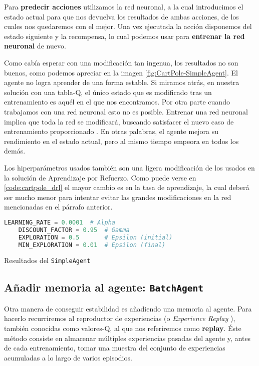 Para \textbf{predecir acciones} utilizamos la red neuronal, a la cual introducimos el estado actual para que nos devuelva los resultados de ambas acciones, de los cuales nos quedaremos con el mejor. Una vez ejecutada la acción disponemos del estado siguiente y la recompensa, lo cual podemos usar para \textbf{entrenar la red neuronal} de nuevo.

Como cabía esperar con una modificación tan ingenua, los resultados no son buenos, como podemos apreciar en la imagen \ref{fig:CartPole-SimpleAgent}. El agente no logra aprender de una forma estable. Si miramos atrás, en nuestra solución con una tabla-Q, el único estado que es modificado tras un entrenamiento es aquél en el que nos encontramos. Por otra parte cuando trabajamos con una red neuronal esto no es posible. Entrenar una red neuronal implica que toda la red se modificará, buscando satisfacer el nuevo caso de entrenamiento proporcionado \citep{Buduma:backprop}. En otras palabras, el agente mejora su rendimiento en el estado actual, pero al mismo tiempo empeora en todos los demás.

Los hiperparámetros usados también son una ligera modificación de los usados en la solución de Aprendizaje por Refuerzo. Como puede verse en \ref{code:cartpole_drl} el mayor cambio es en la tasa de aprendizaje, la cual deberá ser mucho menor para intentar evitar las grandes modificaciones en la red mencionadas en el párrafo anterior.

\begin{minipage}{0.9\linewidth}%
    \begin{lstlisting}[frame=tb, language=Python, caption=Hiperparámetros, label=code:cartpole_drl]
    LEARNING_RATE = 0.0001  # Alpha
    DISCOUNT_FACTOR = 0.95  # Gamma
    EXPLORATION = 0.5       # Epsilon (initial)
    MIN_EXPLORATION = 0.01  # Epsilon (final)
    \end{lstlisting}%
\end{minipage}

%
       {Resultados del \texttt{SimpleAgent}}

\subsection{Añadir memoria al agente: \texttt{BatchAgent}}
\label{sec:cartpoledqn2}

Otra manera de conseguir estabilidad es añadiendo una memoria al agente. Para hacerlo recurriremos al reproductor de experiencias (o \textit{Experience Replay} \citep{Lin1992}), también conocidas como valores-Q, al que nos referiremos como \textbf{replay}. Éste método consiste en almacenar múltiples experiencias pasadas del agente y, antes de cada entrenamiento, tomar una muestra del conjunto de experiencias acumuladas a lo largo de varios episodios.

